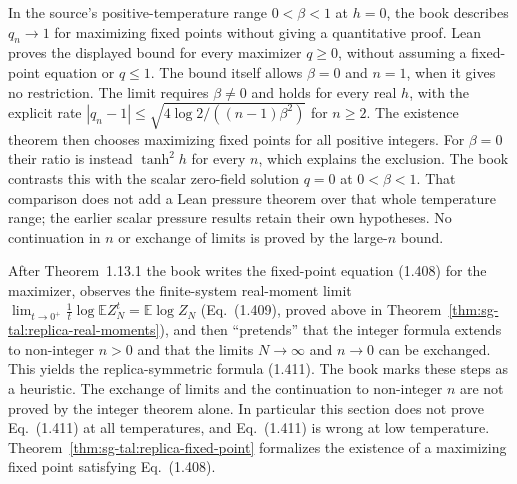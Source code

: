 \begin{remark}\label{rem:sg-tal:replica-large-n-scope}
In the source's positive-temperature range $0<\beta<1$ at $h=0$, the book describes
$q_n\to1$ for maximizing fixed points without giving a quantitative proof.
Lean proves the displayed bound for every maximizer $q\ge0$, without assuming a fixed-point
equation or $q\le1$. The bound itself allows $\beta=0$ and $n=1$, when it gives no restriction.
The limit requires $\beta\ne0$ and holds for every real $h$, with the explicit rate
$|q_n-1|\le\sqrt{4\log2/((n-1)\beta^2)}$ for $n\ge2$.
The existence theorem then chooses maximizing fixed points for all positive integers.
For $\beta=0$ their ratio is instead $\tanh^2h$ for every $n$, which explains the exclusion.
The book contrasts this with the scalar zero-field solution $q=0$ at $0<\beta<1$.
That comparison does not add a Lean pressure theorem over that whole temperature range;
the earlier scalar pressure results retain their own hypotheses.
No continuation in $n$ or exchange of limits is proved by the large-$n$ bound.
\end{remark}

\begin{remark}\label{rem:sg-tal:replica-heuristic}
After Theorem~1.13.1 the book writes the fixed-point equation (1.408) for the maximizer, observes the finite-system real-moment limit $\lim_{t\to0^+}\frac1t\log\mathbb EZ_N^t=\mathbb E\log Z_N$ (Eq.~(1.409), proved above in Theorem~\ref{thm:sg-tal:replica-real-moments}),
and then ``pretends'' that the integer formula extends to non-integer $n>0$ and that the limits $N\to\infty$ and $n\to0$ can be exchanged. This yields the replica-symmetric formula (1.411).
The book marks these steps as a heuristic. The exchange of limits and the continuation to non-integer $n$ are not proved by the integer theorem alone. In particular this section does not prove Eq.~(1.411) at all temperatures, and Eq.~(1.411) is wrong at low temperature.
Theorem~\ref{thm:sg-tal:replica-fixed-point} formalizes the existence of a maximizing fixed point satisfying Eq.~(1.408).
\end{remark}

